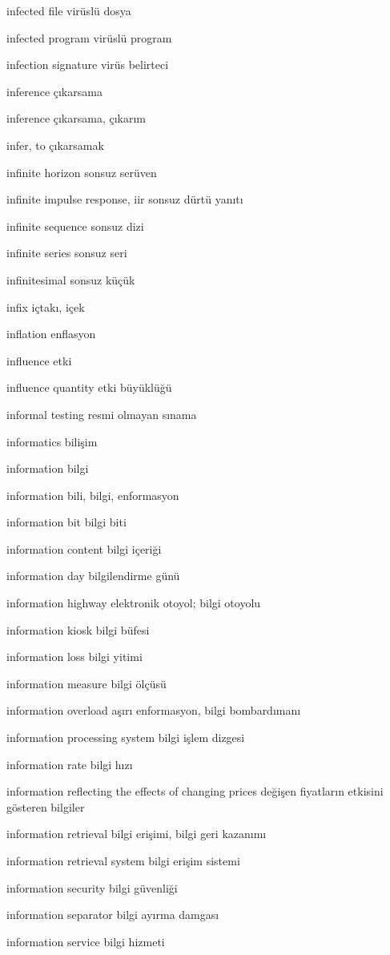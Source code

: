 \documentclass[12pt,fleqn]{article}\usepackage{../../common}
\begin{document}
infected file virüslü dosya

infected program virüslü program

infection signature virüs belirteci

inference çıkarsama

inference çıkarsama, çıkarım

infer, to çıkarsamak

infinite horizon sonsuz serüven

infinite impulse response, iir sonsuz dürtü yanıtı

infinite sequence sonsuz dizi

infinite series sonsuz seri

infinitesimal sonsuz küçük

infix içtakı, içek

inflation enflasyon

influence etki

influence quantity etki büyüklüğü

informal testing resmi olmayan sınama

informatics bilişim

information bilgi

information bili, bilgi, enformasyon

information bit bilgi biti

information content bilgi içeriği

information day bilgilendirme günü

information highway elektronik otoyol; bilgi otoyolu

information kiosk bilgi büfesi

information loss bilgi yitimi

information measure bilgi ölçüsü

information overload aşırı enformasyon, bilgi bombardımanı

information processing system bilgi işlem dizgesi

information rate bilgi hızı

information reflecting the effects of changing prices değişen fiyatların etkisini gösteren bilgiler

information retrieval bilgi erişimi, bilgi geri kazanımı

information retrieval system bilgi erişim sistemi

information security bilgi güvenliği

information separator bilgi ayırma damgası

information service bilgi hizmeti
\end{document}
